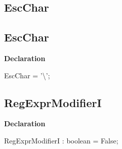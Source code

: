 \documentclass{report}
\newif\ifpdf
\begin{document}
\subsection*{\large{\textbf{EscChar}}\normalsize\hspace{1ex}\hrulefill}
\else
\subsection*{EscChar}
\fi
\label{RegExpr-EscChar}
\begin{list}{}{
\setlength{\itemindent}{0cm}
\setlength{\listparindent}{0cm}
\setlength{\leftmargin}{\evensidemargin}
\addtolength{\leftmargin}{\tmplength}
\settowidth{\labelsep}{X}
\addtolength{\leftmargin}{\labelsep}
\setlength{\labelwidth}{\tmplength}
}
\item[\textbf{Declaration}\hfill]
\ifpdf
\begin{flushleft}
\fi
\begin{ttfamily}
EscChar = '{\textbackslash}';\end{ttfamily}

\ifpdf
\end{flushleft}
\fi

\end{list}
\ifpdf
\subsection*{\large{\textbf{RegExprModifierI}}\normalsize\hspace{1ex}\hrulefill}
\else
\subsection*{RegExprModifierI}
\fi
\label{RegExpr-RegExprModifierI}
\begin{list}{}{
\setlength{\itemindent}{0cm}
\setlength{\listparindent}{0cm}
\setlength{\leftmargin}{\evensidemargin}
\addtolength{\leftmargin}{\tmplength}
\settowidth{\labelsep}{X}
\addtolength{\leftmargin}{\labelsep}
\setlength{\labelwidth}{\tmplength}
}
\item[\textbf{Declaration}\hfill]
\ifpdf
\begin{flushleft}
\fi
\begin{ttfamily}
RegExprModifierI : boolean = False;\end{ttfamily}

\ifpdf
\end{flushleft}
\fi

\end{list}
\ifpdf
\end{document}
